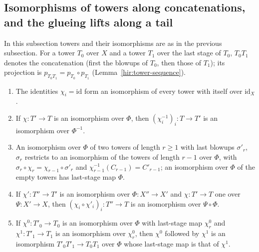 \subsection{Isomorphisms of towers along concatenations, and the glueing lifts along a tail}

In this subsection towers and their isomorphisms are as in the previous subsection. For a tower \(T_0\) over \(X\) and a tower \(T_1\) over the last stage of
\(T_0\), \(T_0T_1\) denotes the concatenation (first the blowups of \(T_0\), then those of \(T_1\)); its projection is \(p_{T_0T_1}=p_{T_0}\circ p_{T_1}\)
(Lemma~\ref{hir:tower-sequence}).

\begin{lemma}
\label{mc:tower-isomorphism-append}
\leanok
\begin{enumerate}
\item The identities \(\chi_i=\mathrm{id}\) form an isomorphism of every tower with itself over \(\mathrm{id}_X\).
\item If \(\chi\colon T'\to T\) is an isomorphism over \(\Phi\), then \((\chi_i^{-1})_i\colon T\to T'\) is an isomorphism over \(\Phi^{-1}\).
\item An isomorphism over \(\Phi\) of two towers of length \(r\ge1\) with last blowups \(\sigma'_r\), \(\sigma_r\) restricts to an isomorphism of the towers of length
\(r-1\) over \(\Phi\), with \(\sigma_r\circ\chi_r=\chi_{r-1}\circ\sigma'_r\) and \(\chi_{r-1}^{-1}(C_{r-1})=C'_{r-1}\); an isomorphism over \(\Phi\) of the empty towers has
last-stage map \(\Phi\).
\item If \(\chi'\colon T''\to T'\) is an isomorphism over \(\Phi\colon X''\to X'\) and \(\chi\colon T'\to T\) one over \(\Psi\colon X'\to X\), then
\((\chi_i\circ\chi'_i)_i\colon T''\to T\) is an isomorphism over \(\Psi\circ\Phi\).
\item If \(\chi^0\colon T'_0\to T_0\) is an isomorphism over \(\Phi\) with last-stage map \(\chi^0_r\) and \(\chi^1\colon T'_1\to T_1\) is an isomorphism over \(\chi^0_r\), then
\(\chi^0\) followed by \(\chi^1\) is an isomorphism \(T'_0T'_1\to T_0T_1\) over \(\Phi\) whose last-stage map is that of \(\chi^1\).
\end{enumerate}
\end{lemma}

